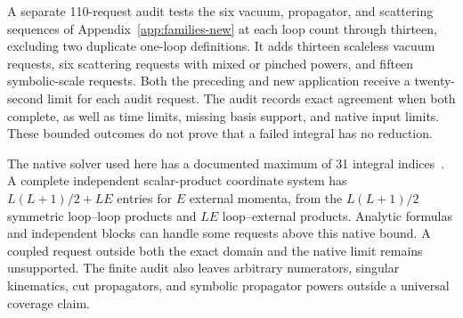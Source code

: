 A separate 110-request audit tests the six vacuum, propagator, and scattering sequences of Appendix~\ref{app:families-new} at each loop count through thirteen, excluding two duplicate one-loop definitions. It adds thirteen scaleless vacuum requests, six scattering requests with mixed or pinched powers, and fifteen symbolic-scale requests. Both the preceding and new application receive a twenty-second limit for each audit request. The audit records exact agreement when both complete, as well as time limits, missing basis support, and native input limits. These bounded outcomes do not prove that a failed integral has no reduction.

The native solver used here has a documented maximum of 31 integral indices~\cite{Kira3}. A complete independent scalar-product coordinate system has $L(L+1)/2+LE$ entries for $E$ external momenta, from the $L(L+1)/2$ symmetric loop--loop products and $LE$ loop--external products. Analytic formulas and independent blocks can handle some requests above this native bound. A coupled request outside both the exact domain and the native limit remains unsupported. The finite audit also leaves arbitrary numerators, singular kinematics, cut propagators, and symbolic propagator powers outside a universal coverage claim.

